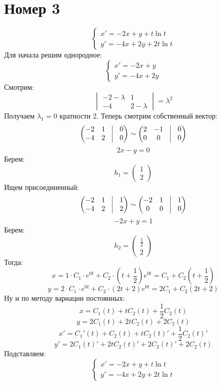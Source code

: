 \documentclass[a4paper,12pt]{article}
\begin{document}
\section*{Номер 3}
\[
\begin{cases}
x' = -2x + y + t \ln t \\
y' = -4x + 2y + 2 t \ln t
\end{cases}
\]
Для начала решим однородное:
\[
\begin{cases}
x' = -2x + y \\
y' = -4x + 2y 
\end{cases}
\]
Смотрим:
\[
\begin{vmatrix}
-2 - \lambda & 1 \\
-4 & 2 - \lambda 
\end{vmatrix} = \lambda^2 
\]
Получаем $\lambda_1 = 0$ кратности 2. Теперь смотрим собственный вектор:
\[
\begin{pmatrix}
-2  & 1 & \vrule & 0 \\
-4 & 2 & \vrule & 0
\end{pmatrix}  \sim 
\begin{pmatrix}
2  & -1& \vrule & 0 \\
0 & 0& \vrule & 0
\end{pmatrix} 
\]
\[
2x - y =0 
\]
Берем:
\[
h_1 = \begin{pmatrix}
1 \\
2
\end{pmatrix}
\]
Ищем присоединенный:
\[
\begin{pmatrix}
-2  & 1 & \vrule & 1\\
-4 & 2 & \vrule & 2
\end{pmatrix} \sim 
\begin{pmatrix}
-2  & 1 & \vrule & 1\\
0 & 0& \vrule & 0
\end{pmatrix}
\]
\[
-2x + y = 1
\]
Берем:
\[
h_2 = \begin{pmatrix}
\frac{1}{2} \\ 2 
\end{pmatrix}
\]
Тогда:
\[
x = 1 \cdot C_1 \cdot e^{0t} + C_2 \cdot \left(t + \frac{1}{2}\right) e^{0t} = C_1 + C_2 \left(t + \frac{1}{2}\right)
\]
\[
y = 2 \cdot C_1 \cdot e^{0t} + C_2 \cdot (2t + 2) e^{0t} = 2C_1 + C_2 (2t + 2)
\]
Ну и по методу вариации постоянных:
\[
x = C_1(t) + tC_2(t) + \frac{1}{2}C_2(t)
\]
\[
y = 2C_1(t) + 2tC_2(t) + 2C_2(t)
\]
\[
x' = C_1'(t) + C_2(t) + tC_2(t)' + \frac{1}{2}C_2(t)' 
\]
\[
y' = 2C_1(t)' + 2tC_2(t)' + 2C_2(t)' + 2 C_2(t)
\]
Подставляем:
\[
\begin{cases}
x' = -2x + y + t \ln t \\
y' = -4x + 2y + 2 t \ln t
\end{cases}
\]
\end{document}
